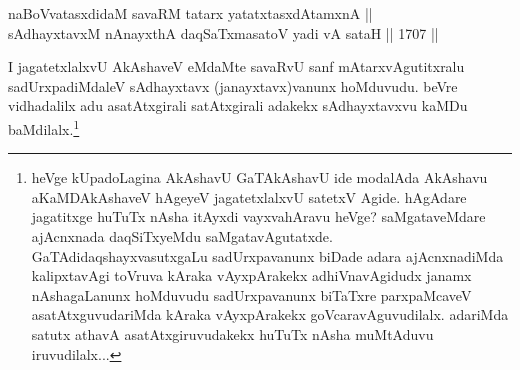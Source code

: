 \begin{shl}
naBoVvatasxdidaM savaRM tatarx yatatxtasxdAtamxnA || \\
sAdhayxtavxM nAnayxthA daqSaTxmasatoV yadi vA sataH \hfill || 1707 ||  
\end{shl}

\begin{artha}
I jagatetxlalxvU AkAshaveV eMdaMte savaRvU sanf mAtarxvAgutitxralu sadUrxpadiMdaleV sAdhayxtavx (janayxtavx)vanunx hoMduvudu. beVre vidhadalilx adu asatAtxgirali satAtxgirali adakekx sAdhayxtavxvu kaMDu baMdilalx.\footnote{heVge kUpadoLagina AkAshavU GaTAkAshavU ide modalAda AkAshavu aKaMDAkAshaveV hAgeyeV jagatetxlalxvU satetxV Agide. hAgAdare jagatitxge huTuTx nAsha itAyxdi vayxvahAravu heVge? saMgataveMdare ajAcnxnada daqSiTxyeMdu saMgatavAgutatxde. GaTAdidaqshayxvasutxgaLu sadUrxpavanunx biDade adara ajAcnxnadiMda kalipxtavAgi toVruva kAraka vAyxpArakekx adhiVnavAgidudx janamx nAshagaLanunx hoMduvudu sadUrxpavanunx biTaTxre parxpaMcaveV asatAtxguvudariMda kAraka vAyxpArakekx goVcaravAguvudilalx. adariMda satutx athavA asatAtxgiruvudakekx huTuTx nAsha muMtAduvu iruvudilalx...}
\end{artha}
